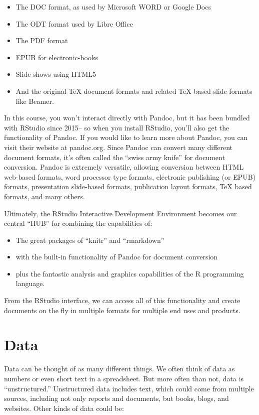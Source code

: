 \documentclass[
]{book}
\providecommand{\tightlist}{%
  \setlength{\itemsep}{0pt}\setlength{\parskip}{0pt}}
\begin{document}
\begin{itemize}
\tightlist
\item
  The DOC format, as used by Microsoft WORD or Google Docs
\item
  The ODT format used by Libre Office
\item
  The PDF format
\item
  EPUB for electronic-books
\item
  Slide shows using HTML5
\item
  And the original TeX document formats and related TeX based slide formats like Beamer.
\end{itemize}

In this course, you won't interact directly with Pandoc, but it has been bundled with RStudio since 2015-- so when you install RStudio, you'll also get the functionality of Pandoc. If you would like to learn more about Pandoc, you can visit their website at pandoc.org. Since Pandoc can convert many different document formats, it's often called the ``swiss army knife'' for document conversion. Pandoc is extremely versatile, allowing conversion between HTML web-based formats, word processor type formats, electronic publishing (or EPUB) formats, presentation slide-based formats, publication layout formats, TeX based formats, and many others.

Ultimately, the RStudio Interactive Development Environment becomes our central ``HUB'' for combining the capabilities of:

\begin{itemize}
\tightlist
\item
  The great packages of ``knitr'' and ``rmarkdown''
\item
  with the built-in functionality of Pandoc for document conversion
\item
  plus the fantastic analysis and graphics capabilities of the R programming language.
\end{itemize}

From the RStudio interface, we can access all of this functionality and create documents on the fly in multiple formats for multiple end uses and products.

\hypertarget{data}{%
\section{Data}\label{data}}

Data can be thought of as many different things. We often think of data as numbers or even short text in a spreadsheet. But more often than not, data is ``unstructured.'' Unstructured data includes text, which could come from multiple sources, including not only reports and documents, but books, blogs, and websites. Other kinds of data could be:
\end{document}
